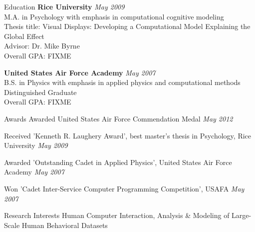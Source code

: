 \documentclass{resume} %
\begin{document}
\nocite{*}


\begin{rSection}{Education}
{\bf Rice University} \hfill {\em May 2009} \\ 
M.A. in Psychology with emphasis in computational cognitive modeling \\
Thesis title: Visual Displays: Developing a Computational Model Explaining the Global Effect \\
Advisor: Dr. Mike Byrne \\
Overall GPA: FIXME 

{\bf United States Air Force Academy} \hfill {\em May 2007} \\ 
B.S. in Physics with emphasis in applied physics and computational methods \\
Distinguished Graduate \\
Overall GPA: FIXME
\end{rSection}


\begin{rSection}{Awards}
Awarded United States Air Force Commendation Medal \hfill {\em May 2012}
\item Received 'Kenneth R. Laughery Award', best master’s thesis in Psychology, Rice University \hfill {\em May 2009}
\item Awarded 'Outstanding Cadet in Applied Physics', United States Air Force Academy \hfill {\em May 2007}
\item Won 'Cadet Inter-Service Computer Programming Competition', USAFA \hfill {\em May 2007}
\end{rSection}


\begin{rSection}{Research Interests}
Human Computer Interaction, Analysis \& Modeling of Large-Scale Human Behavioral Datasets
\end{rSection}
\end{document}
